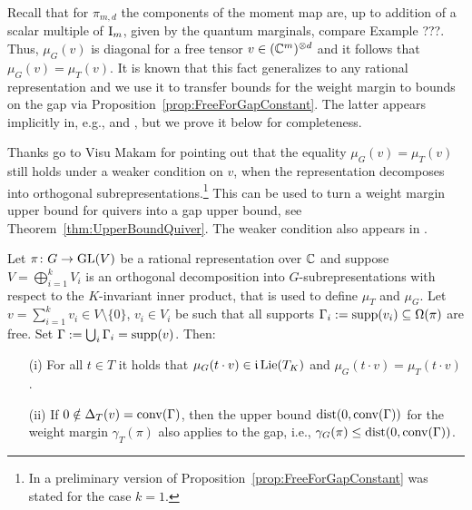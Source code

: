 Recall that for $\pi_{m,d}$ the components of the moment map are, up to addition of a scalar multiple of $\operatorname{I}_m$, given by the quantum marginals, compare Example ???. %
Thus, $\mu_G(v)$ is diagonal for a free tensor $v \in (\mathbb C^m)^{\otimes d}$ and it follows that $\mu_G(v) = \mu_{T}(v)$. It is known that this fact generalizes to any rational representation and we use it to transfer bounds for the weight margin to bounds on the gap via Proposition~\ref{prop:FreeForGapConstant}. The latter appears implicitly in, e.g., \cite[Lemma~7.1]{Sjamaar} and \cite[Proposition~2.2]{franz}, but we prove it below for completeness.

Thanks go to Visu Makam for pointing out that the equality $\mu_G(v) = \mu_{T}(v)$ still holds under a weaker condition on $v$, when the representation decomposes into orthogonal subrepresentations.\footnote{In a preliminary version of \cite{WeightMargin} Proposition~\ref{prop:FreeForGapConstant} was stated for the case $k=1$.}
This can be used to turn a weight margin upper bound for quivers into a gap upper bound, see Theorem~\ref{thm:UpperBoundQuiver}. The weaker condition also appears in \cite[Theorem~6.5]{derksen2020exponential}.


\begin{prop}  \label{prop:FreeForGapConstant}
	Let $\pi \colon G \to \operatorname{GL}(V)$ be a rational representation over $\mathbb C$ %
	and suppose $V = \bigoplus_{i=1}^k V_i$ is an orthogonal decomposition into $G$-subrepresentations with respect to the $K$-invariant inner product, that is used to define $\mu_{T}$ and $\mu_G$. Let $v = 
	\sum_{i=1}^k v_i \in V \setminus \{0\}$, $v_i \in V_i$ be such that all supports $\Gamma_i := \operatorname{supp}(v_i) \subseteq \Omega(\pi)$ are free. Set $\Gamma := \bigcup_i \Gamma_i = \operatorname{supp}(v)$. Then:
		\begin{itemize}
			\item[(i)] For all $t \in T$ it holds that $\mu_G(t \cdot v) \in \mathfrak{i}\operatorname{Lie}(T_K)$ and $\mu_G(t \cdot v) = \mu_{T}(t \cdot v)$.
			
			\item[(ii)] If $0 \notin \Delta_{T}(v) = \operatorname{conv}(\Gamma)$, then the upper bound $\operatorname{dist}(0, \operatorname{conv}(\Gamma))$ for the weight margin $\gamma_{T}(\pi)$ also applies to the gap, i.e., $\gamma_G(\pi) \leq \operatorname{dist}(0, \operatorname{conv}(\Gamma))$.
		\end{itemize}
\end{prop}

